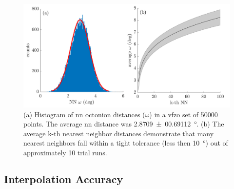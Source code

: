 \documentclass[final,twocolumn,12pt]{elsarticle}
\newcommand{\nnomega}{2.8709 \pm 00.69112}
\begin{document}
\begin{figure}
\centering
\includegraphics[scale=1]{nnhist-knn-50000.png}
\caption{(a) Histogram of \gls{nn} octonion distances ($\omega$) in a \gls{vfzo} set of \num{50000} points. The average \gls{nn} distance was \SI{\nnomega}{\degree}. (b) The average k-th nearest neighbor distances demonstrate that many nearest neighbors fall within a tight tolerance (less then \SI{10}{\degree}) out of approximately 10 trial runs.}
\label{fig:nnhist-knn-50000}
\end{figure}

\subsection{Interpolation Accuracy}
\label{sec:results:accuracy}
\end{document}
